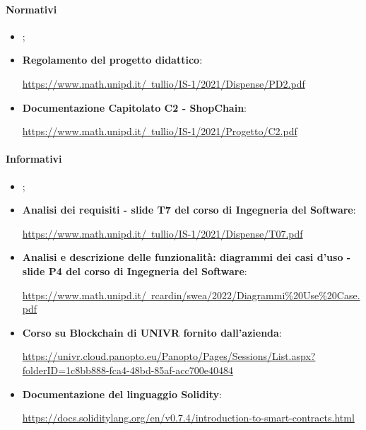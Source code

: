 \paragraph{Normativi}
\begin{itemize}
    \item \textbf{\docNameVersionNdP{}};
    \item \textbf{Regolamento del progetto didattico}:
          \begin{center}
              \href{https://www.math.unipd.it/~tullio/IS-1/2021/Dispense/PD2.pdf}{https://www.math.unipd.it/~tullio/IS-1/2021/Dispense/PD2.pdf}
          \end{center}
    \item \textbf{Documentazione Capitolato C2 - ShopChain}:
          \begin{center}
              \href{https://www.math.unipd.it/~tullio/IS-1/2021/Progetto/C2.pdf}{https://www.math.unipd.it/~tullio/IS-1/2021/Progetto/C2.pdf}
          \end{center}
\end{itemize}

\paragraph{Informativi}
\begin{itemize}
    \item \textbf{\docNameVersionPdP{}};
    \item \textbf{Analisi dei requisiti - slide T7 del corso di Ingegneria del Software}:
          \begin{center}
              \href{https://www.math.unipd.it/~tullio/IS-1/2021/Dispense/T07.pdf}{https://www.math.unipd.it/~tullio/IS-1/2021/Dispense/T07.pdf}
          \end{center}
    \item \textbf{Analisi e descrizione delle funzionalità: diagrammi dei casi d'uso - slide P4 del corso di Ingegneria del Software}:
          \begin{center}
              \href{https://www.math.unipd.it/~rcardin/swea/2022/Diagrammi%20Use%20Case.pdf}{https://www.math.unipd.it/~rcardin/swea/2022/Diagrammi\%20Use\%20Case.pdf}
          \end{center}
    \item \textbf{Corso su Blockchain di UNIVR fornito dall'azienda}:
          \begin{center}
              \href{https://univr.cloud.panopto.eu/Panopto/Pages/Sessions/List.aspx?folderID=1c8bb888-fca4-48bd-85af-acc700e40484}{https://univr.cloud.panopto.eu/Panopto/Pages/Sessions/List.aspx?folderID=1c8bb888-fca4-48bd-85af-acc700e40484}
          \end{center}
    \item \textbf{Documentazione del linguaggio Solidity\glo{}}:
          \begin{center}
              \href{https://docs.soliditylang.org/en/v0.7.4/introduction-to-smart-contracts.html}{https://docs.soliditylang.org/en/v0.7.4/introduction-to-smart-contracts.html}
          \end{center}
\end{itemize}

\clearpage


